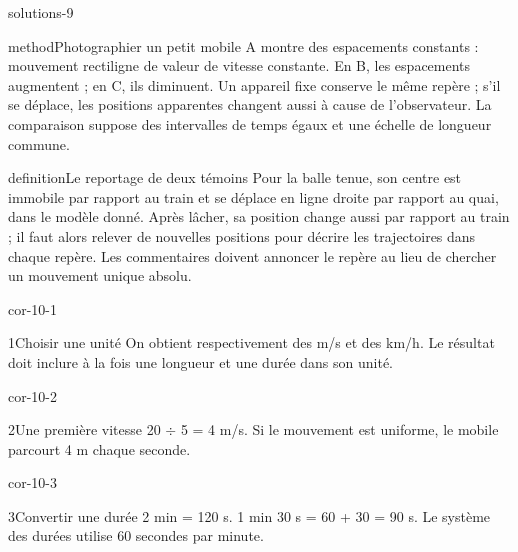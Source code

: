 \documentclass[12pt,twoside,openany]{book}
\begin{document}
\begin{pcFiche}{solutions-9}
\begin{pcEncadre}{method}{Photographier un petit mobile}
A montre des espacements constants : mouvement rectiligne de valeur de vitesse constante. En B, les espacements augmentent ; en C, ils diminuent. Un appareil fixe conserve le même repère ; s’il se déplace, les positions apparentes changent aussi à cause de l’observateur. La comparaison suppose des intervalles de temps égaux et une échelle de longueur commune.\par
\end{pcEncadre}
\label{defi-cor-9}
\begin{pcEncadre}{definition}{Le reportage de deux témoins}
Pour la balle tenue, son centre est immobile par rapport au train et se déplace en ligne droite par rapport au quai, dans le modèle donné. Après lâcher, sa position change aussi par rapport au train ; il faut alors relever de nouvelles positions pour décrire les trajectoires dans chaque repère. Les commentaires doivent annoncer le repère au lieu de chercher un mouvement unique absolu.\par
\end{pcEncadre}
\end{pcFiche}
\clearpage{}
\begin{blocLivre}{cor-10-1}
\begin{corrige}{1}{Choisir une unité}
On obtient respectivement des m/s et des km/h. Le résultat doit inclure à la fois une longueur et une durée dans son unité.\par
\end{corrige}\end{blocLivre}
\begin{blocLivre}{cor-10-2}
\begin{corrige}{2}{Une première vitesse}
20 \(\div\) 5 = 4 m/s. Si le mouvement est uniforme, le mobile parcourt 4 m chaque seconde.\par
\end{corrige}\end{blocLivre}
\begin{blocLivre}{cor-10-3}
\begin{corrige}{3}{Convertir une durée}
2 min = 120 s. 1 min 30 s = 60 + 30 = 90 s. Le système des durées utilise 60 secondes par minute.\par
\end{corrige}\end{blocLivre}
\end{document}
